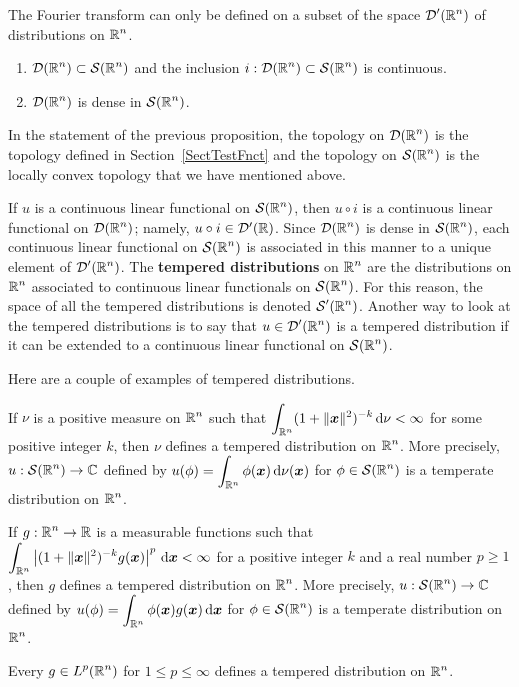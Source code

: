 The Fourier transform can only be defined on a subset of the space
$\displaystyle \mathcal{D}'(\mathbb{R}^n)$ of distributions on $\displaystyle \mathbb{R}^n$.

\begin{prop} \label{DD_S_IncDense}
\begin{enumerate}
\item $\displaystyle \mathcal{D}(\mathbb{R}^n) \subset \mathcal{S}(\mathbb{R}^n)$ and the inclusion
$\displaystyle i:\mathcal{D}(\mathbb{R}^n) \subset \mathcal{S}(\mathbb{R}^n)$ is continuous.
\item $\displaystyle \mathcal{D}(\mathbb{R}^n)$ is dense in $\displaystyle \mathcal{S}(\mathbb{R}^n)$.
\end{enumerate}
\end{prop}

In the statement of the previous proposition, the topology on
$\displaystyle \mathcal{D}(\mathbb{R}^n)$ is the topology defined in
Section~\ref{SectTestFnct} and the topology on
$\displaystyle \mathcal{S}(\mathbb{R}^n)$ is the locally convex topology that we
have mentioned above.

If $u$ is a continuous linear functional on $\displaystyle \mathcal{S}(\mathbb{R}^n)$, then
$u \circ i$ is a continuous linear functional on
$\displaystyle \mathcal{D}(\mathbb{R}^n)$; namely,
$u\circ i \in \mathcal{D}'(\mathbb{R})$.  Since $\displaystyle \mathcal{D}(\mathbb{R}^n)$ is dense in
$\displaystyle \mathcal{S}(\mathbb{R}^n)$, each continuous linear functional on
$\displaystyle \mathcal{S}(\mathbb{R}^n)$ is associated in this manner to a unique
element of $\displaystyle \mathcal{D}'(\mathbb{R}^n)$.
The {\bfseries tempered distributions}
on $\displaystyle \mathbb{R}^n$ are the distributions on $\displaystyle \mathbb{R}^n$
associated to continuous linear functionals on
$\displaystyle \mathcal{S}(\mathbb{R}^n)$.  For this reason, the space of all the tempered
distributions is denoted $\displaystyle \mathcal{S}'(\mathbb{R}^n)$.  Another way to
look at the tempered distributions is to say that
$\displaystyle u \in \mathcal{D}'(\mathbb{R}^n)$ is a
tempered distribution if it can be extended to a continuous linear
functional on $\displaystyle \mathcal{S}(\mathbb{R}^n)$.

\begin{egg}
Here are a couple of examples of tempered distributions.

If $\nu$ is a positive measure on $\displaystyle \mathbb{R}^n$ such that
$\displaystyle \int_{\mathbb{R}^n} (1 + \|{\bm{x}}\|^2)^{-k} \,\mathrm{d}{\nu} < \infty$
for some positive integer $k$, then $\nu$ defines a tempered
distribution on $\displaystyle \mathbb{R}^n$.  More precisely,
$\displaystyle u : \mathcal{S}(\mathbb{R}^n) \to \mathbb{C}$ defined by
$\displaystyle u(\phi) = \int_{\mathbb{R}^n} \phi({\bm{x}}) \,\mathrm{d}{\nu({\bm{x}})}$
for $\displaystyle \phi\in \mathcal{S}(\mathbb{R}^n)$ is a temperate distribution on
$\displaystyle \mathbb{R}^n$.

If $\displaystyle g:\mathbb{R}^n \to \mathbb{R}$ is a measurable functions such that
$\displaystyle \int_{\mathbb{R}^n} \left| (1+\|{\bm{x}}\|^2)^{-k} g({\bm{x}})
\right|^p \,\mathrm{d}{{\bm{x}}} < \infty$ for a positive integer $k$ and a real
number $p \geq 1$, then $g$ defines a tempered distribution on
$\displaystyle \mathbb{R}^n$.
More precisely, $\displaystyle u : \mathcal{S}(\mathbb{R}^n) \to \mathbb{C}$ defined by
$\displaystyle u(\phi) = \int_{\mathbb{R}^n} \phi({\bm{x}}) g({\bm{x}}) \,\mathrm{d}{{\bm{x}}}$
for $\displaystyle \phi\in \mathcal{S}(\mathbb{R}^n)$ is a temperate distribution on
$\displaystyle \mathbb{R}^n$.

Every $\displaystyle g \in L^p(\mathbb{R}^n)$ for $1 \leq p \leq \infty$
defines a tempered distribution on $\displaystyle \mathbb{R}^n$.
\end{egg}

